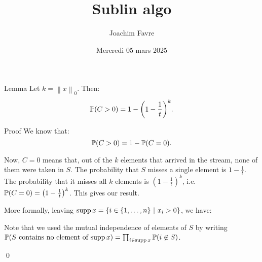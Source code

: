 \documentclass[a4paper]{article}
\title{Sublin algo}
\author{Joachim Favre}
\date{Mercredi 05 mars 2025}
\begin{document}
\maketitle


\begin{parag}{Lemma}
    Let $k = \left\|x\right\|_0$. Then: 
    \[\prob\left(C > 0\right) = 1 - \left(1 - \frac{1}{t}\right)^k.\]

    \begin{subparag}{Proof}
        We know that: 
        \[\prob\left(C > 0\right) = 1 - \prob\left(C = 0\right).\]
        
        Now, $C = 0$ means that, out of the $k$ elements that arrived in the stream, none of them were taken in $S$. The probability that $S$ misses a single element is $1 - \frac{1}{t}$. The probability that it misses all $k$ elements is $\left(1 - \frac{1}{t}\right)^k$, i.e. $\prob\left(C = 0\right) = \left(1 - \frac{1}{t}\right)^k$. This gives our result.

        More formally, leaving $\supp x = \left\{i \in \left\{1, \ldots, n\right\} \suchthat x_i > 0\right\}$, we have: 
        
        Note that we used the mutual independence of elements of $S$ by writing $\prob\left(\text{$S$ contains no element of $\supp x$}\right) = \prod_{i \in \supp x} \prob\left(i \not \in S\right)$.

        \qed
    \end{subparag}
\end{parag}
\end{document}
